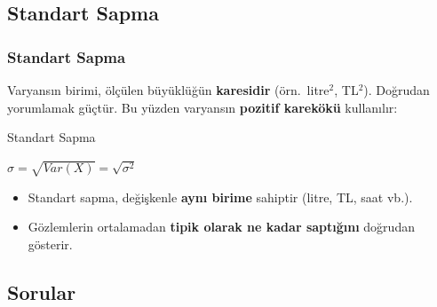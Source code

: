 \documentclass[light]{lutbeamer}
\begin{document}
\subsection{Standart Sapma}

\begin{frame}[fragile]
  \frametitle{Standart Sapma}
  Varyansın birimi, ölçülen büyüklüğün \textbf{karesidir} (örn.\ litre$^2$, TL$^2$). Doğrudan yorumlamak güçtür. Bu yüzden varyansın \textbf{pozitif karekökü} kullanılır:

  \begin{center}
    \begin{minipage}{0.8\textwidth}
      \begin{block}{Standart Sapma}
        \begin{center}
          $\sigma = \sqrt{Var(X)} = \sqrt{\sigma^2}$
        \end{center}
      \end{block}
    \end{minipage}
  \end{center}

  \begin{itemize}
    \item Standart sapma, değişkenle \textbf{aynı birime} sahiptir (litre, TL, saat vb.).
    \item Gözlemlerin ortalamadan \textbf{tipik olarak ne kadar saptığını} doğrudan gösterir.
  \end{itemize}
\end{frame}

\subsection{Sorular}
\end{document}

